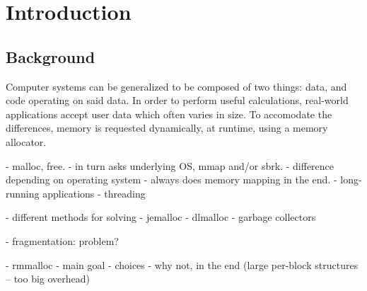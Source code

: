 \documentclass[a4paper,twoside,openany]{report}
\begin{document}
\chapter{Introduction}

\section{Background}

Computer systems can be generalized to be composed of two things: data, and code operating on said data.  In order to
perform useful calculations, real-world applications accept user data which often varies in size.  To accomodate the
differences, memory is requested dynamically, at runtime, using a memory allocator. 

- malloc, free.
    - in turn asks underlying OS, mmap and/or sbrk.
        - difference depending on operating system
    - always does memory mapping in the end.
- long-running applications
- threading

- different methods for solving
- jemalloc
- dlmalloc
- garbage collectors

- fragmentation: problem?

- rmmalloc
- main goal
- choices
- why not, in the end (large per-block structures -- too big overhead)


\clearpage
\end{document}
